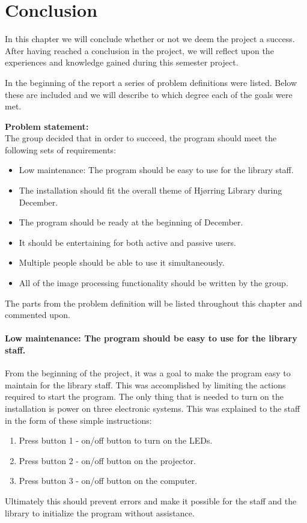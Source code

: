 \chapter{Conclusion}

In this chapter we will conclude whether or not we deem the project a success. After having reached a conclusion in the project, we will reflect upon the experiences and knowledge gained during this semester project.

In the beginning of the report a series of problem definitions were listed. Below these are included and we will describe to which degree each of the goals were met.

\textbf{Problem statement:}\\
The group decided that in order to succeed, the program should meet the following sets of requirements:
\begin{itemize}
\item Low maintenance: The program should be easy to use for the library staff.
\item The installation should fit the overall theme of Hj{\o}rring Library during December.
\item The program should be ready at the beginning of December.
\item It should be entertaining for both active and passive users.
\item Multiple people should be able to use it simultaneously.
\item All of the image processing functionality should be written by the group.
\end{itemize}

The parts from the problem definition will be listed throughout this chapter and commented upon.

\subsubsection{Low maintenance: The program should be easy to use for the library staff.}
From the beginning of the project, it was a goal to make the program easy to maintain for the library staff. This was accomplished by limiting the actions required to start the program. The only thing that is needed to turn on the installation is power on three electronic systems. This was explained to the staff in the form of these simple instructions:
\begin{enumerate}
\item Press button 1 - on/off button to turn on the LEDs.
\item Press button 2 - on/off button on the projector.
\item Press button 3 - on/off button on the computer.
\end{enumerate}
Ultimately this should prevent errors and make it possible for the staff and the library to initialize the program without assistance.

